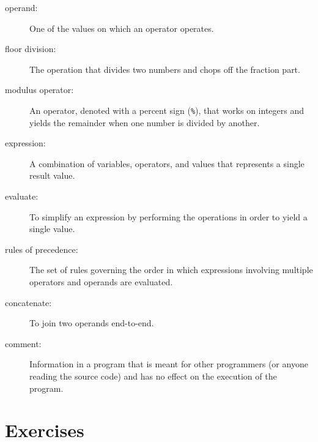 \documentclass[10pt]{book}
\begin{document}
\begin{description}
\item[operand:]  One of the values on which an operator operates.

\item[floor division:] The operation that divides two numbers and chops off
the fraction part.

\item[modulus operator:]  An operator, denoted with a percent sign
({\tt \%}), that works on integers and yields the remainder when one
number is divided by another.

\item[expression:]  A combination of variables, operators, and values that
represents a single result value.

\item[evaluate:]  To simplify an expression by performing the operations
in order to yield a single value.

\item[rules of precedence:]  The set of rules governing the order in which
expressions involving multiple operators and operands are evaluated.

\item[concatenate:]  To join two operands end-to-end.

\item[comment:]  Information in a program that is meant for other
programmers (or anyone reading the source code) and has no effect on the
execution of the program.

\end{description}


\section{Exercises}
\end{document}
